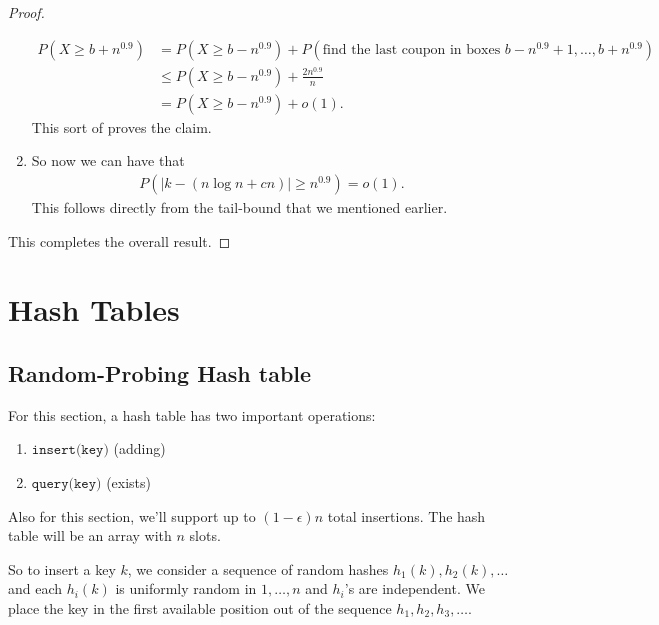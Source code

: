 \documentclass{report}
\begin{document}
\begin{proof}
\begin{enumerate}[label=(\alph*)]
        \begin{align*}
            P(X \geq b + n^{0.9}) &= P(X \geq b - n^{0.9}) + P(\text{find the last coupon in boxes $b - n^{0.9} + 1, \ldots, b+n^{0.9}$}) \\
            &\leq P(X \geq b - n^{0.9}) + \frac{2n^{0.9}}{n} \\
            &= P(X \geq b - n^{0.9}) + o(1).
        \end{align*}
        This sort of proves the claim.
        \item So now we can have that 
        \begin{align*}
            P(|k - (n \log n + cn) | \geq n^{0.9}) = o(1).
        \end{align*}
        This follows directly from the tail-bound that we mentioned earlier.
    \end{enumerate}
    This completes the overall result.
\end{proof}



\newpage
\chapter{Hash Tables}
\section{Random-Probing Hash table}
For this section, a hash table has two important operations:
\begin{enumerate}
    \item $\texttt{insert(key)}$ (adding)
    \item $\texttt{query(key)}$ (exists)
\end{enumerate} 
Also for this section, we'll support up to $(1-\epsilon)n$ total insertions. The hash table will be an array with $n$ slots. 

\begin{center}
\end{center}
So to insert a key $k$, we consider a sequence of random hashes $h_1(k), h_2(k), \ldots$ and each $h_i(k)$ is uniformly random in $1, \ldots, n$ and $h_i$'s are independent. We place the key in the first available position out of the sequence $h_1, h_2, h_3, \ldots$. 
\end{document}
